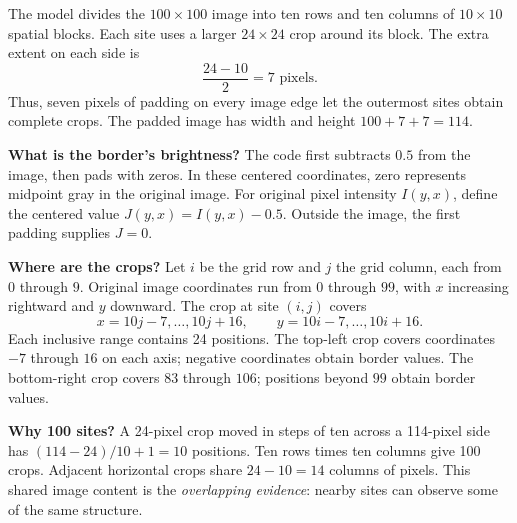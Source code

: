 \documentclass[11pt]{article}
\newcommand{\heading}[2]{\noindent{\color{teal}\small\bfseries #1}\par\vspace{2pt}{\color{navy}\LARGE\bfseries #2}\par\vspace{5pt}}
\newcommand{\term}[1]{\textbf{\color{navy}#1}}
\begin{document}
\newpage
\heading{2 / IMAGE PADDING}{Giving edge crops enough room}
The model divides the $100\times100$ image into ten rows and ten columns of $10\times10$ spatial blocks. Each site uses a larger $24\times24$ crop around its block. The extra extent on each side is
\[
\frac{24-10}{2}=7\text{ pixels}.
\]
Thus, seven pixels of padding on every image edge let the outermost sites obtain complete crops. The padded image has width and height $100+7+7=114$.

\begin{center}
\end{center}

\term{What is the border's brightness?} The code first subtracts $0.5$ from the image, then pads with zeros. In these centered coordinates, zero represents midpoint gray in the original image. For original pixel intensity $I(y,x)$, define the centered value $J(y,x)=I(y,x)-0.5$. Outside the image, the first padding supplies $J=0$.

\term{Where are the crops?} Let $i$ be the grid row and $j$ the grid column, each from $0$ through $9$. Original image coordinates run from $0$ through $99$, with $x$ increasing rightward and $y$ downward. The crop at site $(i,j)$ covers
\[
\boxed{x=10j-7,\ldots,10j+16,\qquad
 y=10i-7,\ldots,10i+16.}
\]
Each inclusive range contains 24 positions. The top-left crop covers coordinates $-7$ through $16$ on each axis; negative coordinates obtain border values. The bottom-right crop covers $83$ through $106$; positions beyond $99$ obtain border values.

\term{Why 100 sites?} A 24-pixel crop moved in steps of ten across a 114-pixel side has $(114-24)/10+1=10$ positions. Ten rows times ten columns give 100 crops. Adjacent horizontal crops share $24-10=14$ columns of pixels. This shared image content is the \emph{overlapping evidence}: nearby sites can observe some of the same structure.
\end{document}
